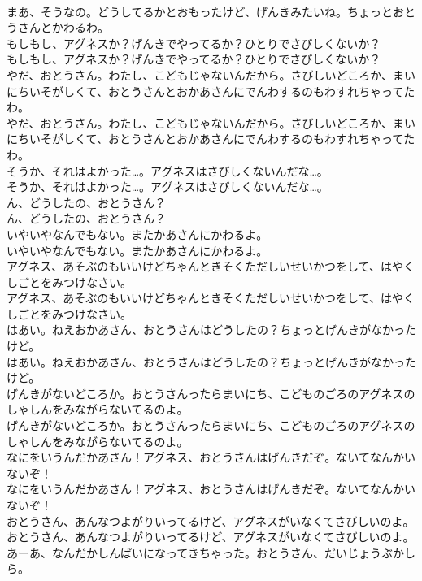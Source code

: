 \documentclass[8pt]{extreport}
\begin{document}
\begin{CJK}{UTF8}{min}
\\	まあ、そうなの。どうしてるかとおもったけど、げんきみたいね。ちょっとおとうさんとかわるわ。
\\	もしもし、アグネスか？げんきでやってるか？ひとりでさびしくないか？
\\	もしもし、アグネスか？げんきでやってるか？ひとりでさびしくないか？
\\	やだ、おとうさん。わたし、こどもじゃないんだから。さびしいどころか、まいにちいそがしくて、おとうさんとおかあさんにでんわするのもわすれちゃってたわ。
\\	やだ、おとうさん。わたし、こどもじゃないんだから。さびしいどころか、まいにちいそがしくて、おとうさんとおかあさんにでんわするのもわすれちゃってたわ。
\\	そうか、それはよかった…。アグネスはさびしくないんだな…。
\\	そうか、それはよかった…。アグネスはさびしくないんだな…。
\\	ん、どうしたの、おとうさん？
\\	ん、どうしたの、おとうさん？
\\	いやいやなんでもない。またかあさんにかわるよ。
\\	いやいやなんでもない。またかあさんにかわるよ。
\\	アグネス、あそぶのもいいけどちゃんときそくただしいせいかつをして、はやくしごとをみつけなさい。
\\	アグネス、あそぶのもいいけどちゃんときそくただしいせいかつをして、はやくしごとをみつけなさい。
\\	はあい。ねえおかあさん、おとうさんはどうしたの？ちょっとげんきがなかったけど。
\\	はあい。ねえおかあさん、おとうさんはどうしたの？ちょっとげんきがなかったけど。
\\	げんきがないどころか。おとうさんったらまいにち、こどものごろのアグネスのしゃしんをみながらないてるのよ。
\\	げんきがないどころか。おとうさんったらまいにち、こどものごろのアグネスのしゃしんをみながらないてるのよ。
\\	なにをいうんだかあさん！アグネス、おとうさんはげんきだぞ。ないてなんかいないぞ！
\\	なにをいうんだかあさん！アグネス、おとうさんはげんきだぞ。ないてなんかいないぞ！
\\	おとうさん、あんなつよがりいってるけど、アグネスがいなくてさびしいのよ。
\\	おとうさん、あんなつよがりいってるけど、アグネスがいなくてさびしいのよ。
\\	あーあ、なんだかしんぱいになってきちゃった。おとうさん、だいじょうぶかしら。

\end{CJK}
\end{document}
